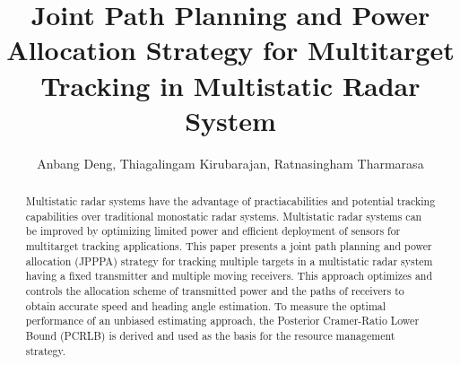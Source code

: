 \documentclass[12pt,journal,draftclsnofoot,onecolumn]{IEEEtran}
\title{Joint Path Planning and Power Allocation Strategy for Multitarget Tracking in Multistatic Radar System}
\author{Anbang Deng, Thiagalingam Kirubarajan, Ratnasingham Tharmarasa}
\date{}
\begin{document}
\maketitle

\begin{abstract}
Multistatic radar systems have the advantage of practiacabilities and potential tracking capabilities over traditional monostatic radar systems.
Multistatic radar systems can be improved by optimizing limited power and efficient deployment of sensors for multitarget tracking applications. 
This paper presents a joint path planning and power allocation (JPPPA) strategy for tracking multiple targets in a multistatic radar system having a fixed transmitter and multiple moving receivers. 
This approach optimizes and controls the allocation scheme of transmitted power and the paths of receivers to obtain accurate speed and heading angle estimation.
To measure the optimal performance of an unbiased estimating approach, the Posterior Cramer-Ratio Lower Bound (PCRLB) is derived and used as the basis for the resource management strategy. %

\end{abstract}
\end{document}
